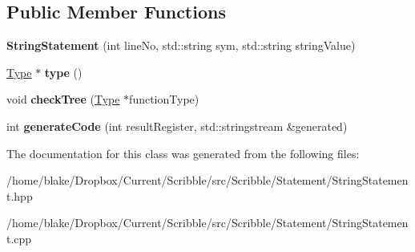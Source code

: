 \subsection*{Public Member Functions}
\begin{DoxyCompactItemize}
\item 
\hypertarget{class_scribble_core_1_1_string_statement_ae88457a1b4095682196ebc13da71cf0e}{{\bfseries String\-Statement} (int line\-No, std\-::string sym, std\-::string string\-Value)}\label{class_scribble_core_1_1_string_statement_ae88457a1b4095682196ebc13da71cf0e}

\item 
\hypertarget{class_scribble_core_1_1_string_statement_ac7c9a403ea405c1d248079bdb59a4b4b}{\hyperlink{class_scribble_core_1_1_type}{Type} $\ast$ {\bfseries type} ()}\label{class_scribble_core_1_1_string_statement_ac7c9a403ea405c1d248079bdb59a4b4b}

\item 
\hypertarget{class_scribble_core_1_1_string_statement_a4740fbc28660e425aba8d9ad1ed9739d}{void {\bfseries check\-Tree} (\hyperlink{class_scribble_core_1_1_type}{Type} $\ast$function\-Type)}\label{class_scribble_core_1_1_string_statement_a4740fbc28660e425aba8d9ad1ed9739d}

\item 
\hypertarget{class_scribble_core_1_1_string_statement_a9483a61bc8cc850eee665e1194a778ba}{int {\bfseries generate\-Code} (int result\-Register, std\-::stringstream \&generated)}\label{class_scribble_core_1_1_string_statement_a9483a61bc8cc850eee665e1194a778ba}

\end{DoxyCompactItemize}


The documentation for this class was generated from the following files\-:\begin{DoxyCompactItemize}
\item 
/home/blake/\-Dropbox/\-Current/\-Scribble/src/\-Scribble/\-Statement/String\-Statement.\-hpp\item 
/home/blake/\-Dropbox/\-Current/\-Scribble/src/\-Scribble/\-Statement/String\-Statement.\-cpp\end{DoxyCompactItemize}
